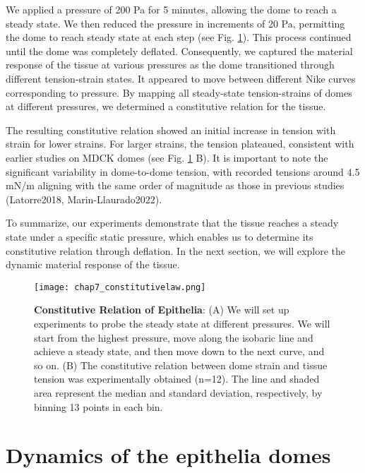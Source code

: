 We applied a pressure of 200 Pa for 5 minutes, allowing the dome to reach a steady state. We then reduced the pressure in increments of 20 Pa, permitting the dome to reach steady state at each step (see Fig. \ref{fig_7_5}). This process continued until the dome was completely deflated. Consequently, we captured the material response of the tissue at various pressures as the dome transitioned through different tension-strain states. It appeared to move between different Nike curves corresponding to pressure. By mapping all steady-state tension-strains of domes at different pressures, we determined a constitutive relation for the tissue.

The resulting constitutive relation showed an initial increase in tension with strain for lower strains. For larger strains, the tension plateaued, consistent with earlier studies on MDCK domes (see Fig. \ref{fig_7_5} B). It is important to note the significant variability in dome-to-dome tension, with recorded tensions around 4.5 mN/m aligning with the same order of magnitude as those in previous studies (Latorre2018, Marin-Llaurado2022).

To summarize, our experiments demonstrate that the tissue reaches a steady state under a specific static pressure, which enables us to determine its constitutive relation through deflation. In the next section, we will explore the dynamic material response of the tissue.

\begin{figure}
	\centering
	\texttt{[image: chap7\_constitutivelaw.png]}
	\caption{\label{fig_7_5} \textbf{Constitutive Relation of Epithelia}: (A) We will set up experiments to probe the steady state at different pressures. We will start from the highest pressure, move along the isobaric line and achieve a steady state, and then move down to the next curve, and so on.	(B) The constitutive relation between dome strain and tissue tension was experimentally obtained (n=12). The line and shaded area represent the median and standard deviation, respectively, by binning 13 points in each bin.
	}
\end{figure}


\hypertarget{dynamics-of-the-epithelia-domes}{%
	\section{Dynamics of the epithelia
		domes}\label{dynamics-of-the-epithelia-domes}}

